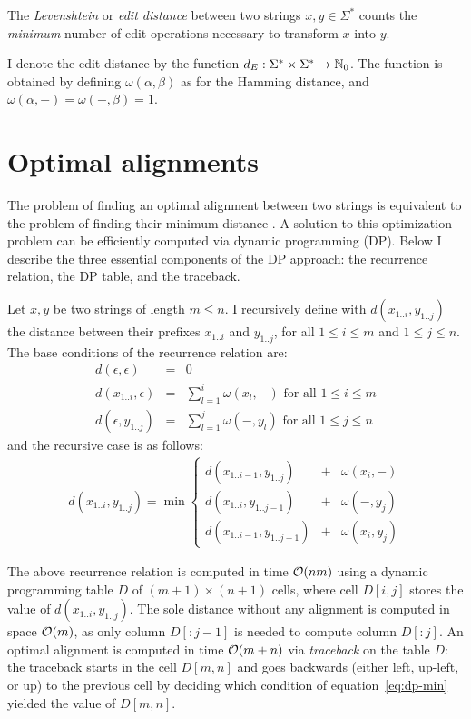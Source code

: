 \begin{definition}
\label{def:edit}
The \emph{Levenshtein} or \emph{edit distance} between two strings $x,y \in \Sigma^{*}$ counts the \emph{minimum} number of edit operations necessary to transform $x$ into $y$.
\end{definition}
I denote the edit distance by the function $d_E : \Sigma^{*} \times \Sigma^{*} \rightarrow \mathbb {N}_0$.
The function is obtained by defining $\omega(\alpha,\beta)$ as for the Hamming distance, and $\omega(\alpha,-) = \omega(-,\beta) = 1$.

\section{Optimal alignments}

The problem of finding an optimal alignment between two strings is equivalent to the problem of finding their minimum distance \citep{Gusfield1997}.
A solution to this optimization problem can be efficiently computed via dynamic programming (DP).
Below I describe the three essential components of the DP approach: the recurrence relation, the DP table, and the traceback.

Let $x,y$ be two strings of length $m \leq n$.
I recursively define with $d(x_{1..i},y_{1..j})$ the distance between their prefixes $x_{1..i}$ and $y_{1..j}$, for all $1 \leq i \leq m$ and $1 \leq j \leq n$.
The base conditions of the recurrence relation are:
\begin{eqnarray}
d(\epsilon,\epsilon)&=&0\\
d(x_{1..i},\epsilon)&=&\sum_{l=1}^{i}{\omega(x_l, -)} \text{ for all } 1 \leq i \leq m\\
d(\epsilon, y_{1..j})&=&\sum_{l=1}^{j}{\omega(-, y_l)} \text{ for all } 1 \leq j \leq n
\end{eqnarray}
and the recursive case is as follows:
\begin{eqnarray}
d(x_{1..i},y_{1..j}) = \min \left\{
\begin{array}{lcl}
d(x_{1..i-1},y_{1..j})&+&\omega(x_i, -)\\
d(x_{1..i},y_{1..j-1})&+&\omega(-, y_j)\\
d(x_{1..i-1},y_{1..j-1})&+&\omega(x_i, y_j)
\end{array}
\right.\label{eq:dp-min}
\end{eqnarray}

The above recurrence relation is computed in time $\mathcal{O}(nm)$ using a dynamic programming table $D$ of $(m+1) \times (n+1)$ cells, where cell $D[i,j]$ stores the value of $d(x_{1..i},y_{1..j})$.
The sole distance without any alignment is computed in space $\mathcal{O}(m)$, as only column $D[:j-1]$ is needed to compute column $D[:j]$.
An optimal alignment is computed in time $\mathcal{O}(m + n)$ via \emph{traceback} on the table $D$:
the traceback starts in the cell $D[m,n]$ and goes backwards (either left, up-left, or up) to the previous cell by deciding which condition of equation~\ref{eq:dp-min} yielded the value of $D[m,n]$.

